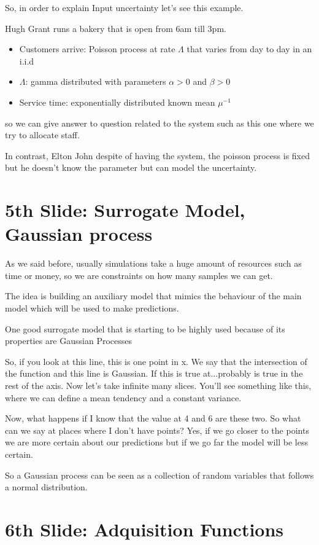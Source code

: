 \documentclass[10pt]{article}
\begin{document}
So, in order to explain Input uncertainty let's see this example.

Hugh Grant runs a bakery that is open from
6am till 3pm. 
\begin{itemize}
	\item Customers arrive: Poisson process at rate $\Lambda$ that varies from day to day in an i.i.d
	\item $\Lambda$: gamma distributed with parameters $\alpha > 0$ and $\beta > 0$
	\item Service time: exponentially distributed known mean $\mu^{-1}$
\end{itemize}

so we can give answer to question related to the system such as this one where we try to allocate staff.

In contrast, Elton John despite of having the system, the poisson process is fixed but he doesn't know the parameter but can model the uncertainty.

 
 \section{5th Slide: Surrogate Model, Gaussian process}
 
 As we said before, usually simulations take a huge amount of resources such as time or money, so we are constraints on how many samples we can get.
 
 The idea is building an auxiliary model that mimics the behaviour of the main model which will be used to make predictions.
 
 One good surrogate model that is starting to be highly used because of its properties are Gaussian Processes
 
 So, if you look at this line, this is one point in x. 
 We say that the intersection of the function and this line is Gaussian. If this is true at...probably is true in the rest of the axis.
 Now let's take infinite many slices. You'll see something like this, where we can define a mean tendency and a constant variance.
 
 Now, what happens if I know that the value at 4 and 6 are these two. So what can we say at places where I don't have points?
 Yes, if we go closer to the points we are more certain about our predictions but if we go far the model will be less certain.
 
 So a Gaussian process can be seen as a collection of random variables that follows a normal distribution.
 
 \section{6th Slide: Adquisition Functions}
 
\end{document}
